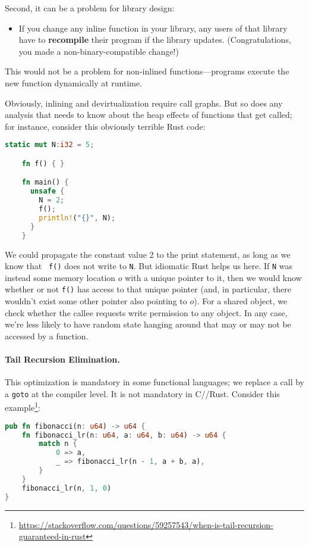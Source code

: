 Second, it can be a problem for library design:
  \begin{itemize}[noitemsep]
    \item If you change any inline function in your library, any users
      of that library have to {\bf recompile} their program if the
      library updates. (Congratulations, you made a non-binary-compatible change!)
  \end{itemize}
This would not be a problem for non-inlined functions---programs execute the new function
dynamically at runtime.

Obviously, inlining and devirtualization require call graphs. But so
does any analysis that needs to know about the heap effects of
functions that get called; for instance, consider this obviously terrible Rust code:

{\small
\begin{lstlisting}[language=Rust]
    static mut N:i32 = 5;

    fn f() { }

    fn main() {
      unsafe { 
        N = 2;
        f();
        println!("{}", N);  
      }
    }
    \end{lstlisting}
}
We could propagate the constant value 2 to the print statement,
as long as we know that {\tt
f()} does not write to {\tt N}. But idiomatic Rust helps us
here. If \texttt{N} was instead some memory location $o$ with a unique
pointer to it, then we would know whether or not \texttt{f()} has
access to that unique pointer (and, in particular, there wouldn't exist some other
pointer also pointing to $o$). For a shared object, we check whether the callee
requests write permission to any object. In any case, we're less likely to have random
state hanging around that may or may not be accessed by a function.

\paragraph{Tail Recursion Elimination.} This optimization is mandatory
in some functional languages; we replace a call by a {\tt goto} at the
compiler level. It is not mandatory in C/\CPP/Rust.
Consider this example\footnote{\url{https://stackoverflow.com/questions/59257543/when-is-tail-recursion-guaranteed-in-rust}}:

{\small
\begin{lstlisting}[language=Rust]
pub fn fibonacci(n: u64) -> u64 {
    fn fibonacci_lr(n: u64, a: u64, b: u64) -> u64 {
        match n {
            0 => a,
            _ => fibonacci_lr(n - 1, a + b, a),
        }
    }
    fibonacci_lr(n, 1, 0)
}
\end{lstlisting}
}

